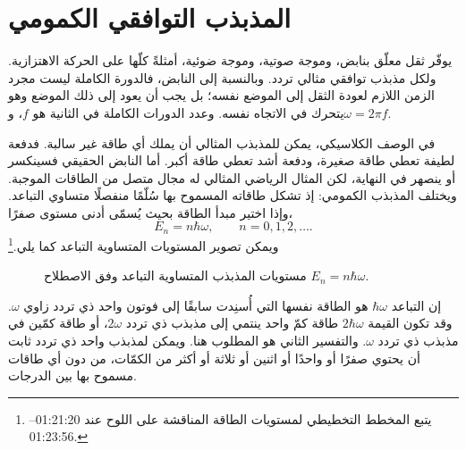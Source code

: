 \begin{classroomqa}
\end{classroomqa}

\section{المذبذب التوافقي الكمومي}

يوفّر ثقل معلّق بنابض، وموجة صوتية، وموجة ضوئية، أمثلةً كلّها على الحركة الاهتزازية. ولكل مذبذب توافقي مثالي تردد. وبالنسبة إلى النابض، فالدورة الكاملة ليست مجرد الزمن اللازم لعودة الثقل إلى الموضع نفسه؛ بل يجب أن يعود إلى ذلك الموضع وهو يتحرك في الاتجاه نفسه. وعدد الدورات الكاملة في الثانية هو \(f\)، و\(\omega=2\pi f\).

في الوصف الكلاسيكي، يمكن للمذبذب المثالي أن يملك أي طاقة غير سالبة. فدفعة لطيفة تعطي طاقة صغيرة، ودفعة أشد تعطي طاقة أكبر. أما النابض الحقيقي فسينكسر أو ينصهر في النهاية، لكن المثال الرياضي المثالي له مجال متصل من الطاقات الموجبة. ويختلف المذبذب الكمومي: إذ تشكل طاقاته المسموح بها سُلّمًا منفصلًا متساوي التباعد. وإذا اختير مبدأ الطاقة بحيث يُسمّى أدنى مستوى صفرًا،
\begin{equation}
E_n=n\hbar\omega,
\qquad n=0,1,2,\ldots .
\end{equation}
ويمكن تصوير المستويات المتساوية التباعد كما يلي.\footnote{يتبع المخطط التخطيطي لمستويات الطاقة المناقشة على اللوح عند 01:21:20--01:23:56.}

\begin{figure}[t]
\centering
{}
\caption{مستويات المذبذب المتساوية التباعد وفق الاصطلاح \(E_n=n\hbar\omega\).}
\end{figure}

إن التباعد \(\hbar\omega\) هو الطاقة نفسها التي أُسنِدت سابقًا إلى فوتون واحد ذي تردد زاوي \(\omega\). وقد تكون القيمة \(2\hbar\omega\) طاقة كمّ واحد ينتمي إلى مذبذب ذي تردد \(2\omega\)، أو طاقة كمّين في مذبذب ذي تردد \(\omega\). والتفسير الثاني هو المطلوب هنا. ويمكن لمذبذب واحد ذي تردد ثابت أن يحتوي صفرًا أو واحدًا أو اثنين أو ثلاثة أو أكثر من الكمّات، من دون أي طاقات مسموح بها بين الدرجات.

